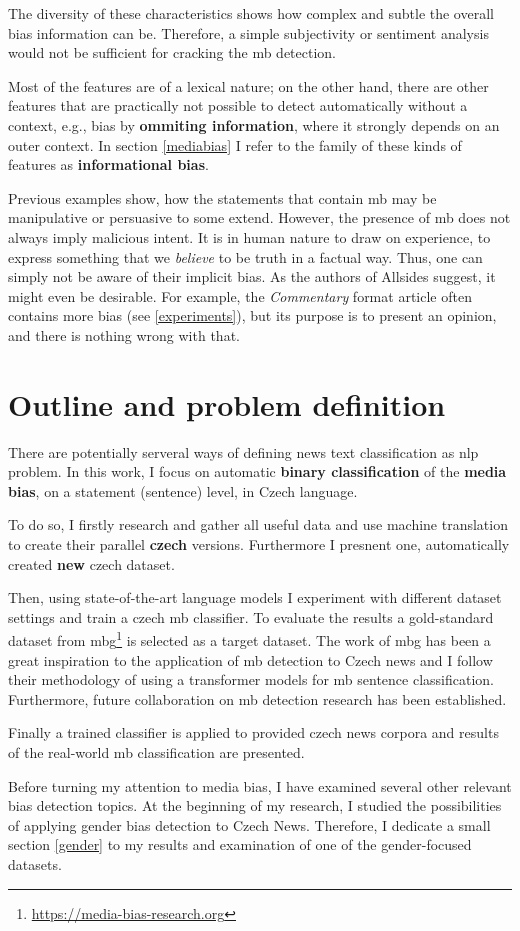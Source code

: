 The diversity of these characteristics shows how complex and subtle the overall bias information can be. Therefore, a simple subjectivity or sentiment analysis would not be sufficient for cracking the \gls{mb} detection. 

Most of the features are of a lexical nature; on the other hand, there are other features that are practically not possible to detect automatically without a context, e.g., bias by \textbf{ommiting information}, where it strongly depends on an outer context. In section \ref{mediabias} I refer to the family of these kinds of features as \textbf{informational bias}.


Previous examples show, how the statements that contain \gls{mb} may be manipulative or persuasive to some extend. However, the presence of \gls{mb} does not always imply malicious intent. It is in human nature to draw on experience, to express something that we \textit{believe} to be truth in a factual way. Thus, one can simply not be aware of their implicit bias. As the authors of Allsides suggest, it might even be desirable. For example, the \textit{Commentary} format article often contains more bias (see \ref{experiments}), but its purpose is to present an opinion, and there is nothing wrong with that.


\section{Outline and problem definition}
There are potentially serveral ways of defining news text classification as \gls{nlp} problem.
In this work, I focus on automatic \textbf{binary classification} of the \textbf{media bias}, on a statement (sentence) level, in Czech language.

To do so, I firstly research and gather all useful data and use machine translation to create their parallel \textbf{czech} versions. Furthermore I presnent one, automatically created \textbf{new} czech dataset. 

Then, using state-of-the-art language models I experiment with different dataset settings and train a czech \gls{mb} classifier. To evaluate the results a gold-standard dataset from \gls{mbg}\footnote{\url{https://media-bias-research.org}} is selected as a target dataset. The work of \gls{mbg} has been a great inspiration to the application of \gls{mb} detection to Czech news and I follow their methodology of using a transformer models for  \gls{mb} sentence classification. Furthermore, future collaboration on \gls{mb} detection research has been established.

Finally a trained classifier is applied to provided czech news corpora and results of the real-world \gls{mb} classification are presented.

Before turning my attention to media bias, I have examined several other relevant bias detection topics. At the beginning of my research, I studied the possibilities of applying gender bias detection to Czech News. Therefore, I dedicate a small section \ref{gender} to my results and examination of one of the gender-focused datasets.



